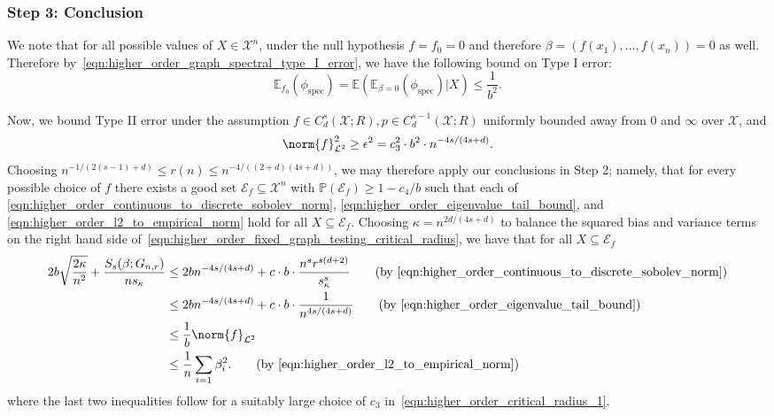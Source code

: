 \documentclass{article}
\newcommand{\1}{\mathbf{1}}
\newcommand{\Xset}{\mathcal{X}}
\newcommand{\Leb}{\mathcal{L}}
\newcommand{\Pbb}{\mathbb{P}}
\newcommand{\Ebb}{\mathbb{E}}
\newcommand{\spec}{\mathrm{spec}}
\theoremstyle{alden}
\theoremstyle{aldenthm}
\theoremstyle{definition}
\theoremstyle{remark}
\begin{document}
\subsubsection{Step 3: Conclusion}

We note that for all possible values of $X \in \Xset^n$, under the null hypothesis $f = f_0 = 0$ and therefore $\beta = (f(x_1),\ldots,f(x_n)) = 0$ as well. Therefore by~\eqref{eqn:higher_order_graph_spectral_type_I_error}, we have the following bound on Type I error:
\begin{equation}
\Ebb_{f_0}(\phi_{\mathrm{spec}}) = \mathbb{E}(\mathbb{E}_{\beta = 0}(\phi_{\spec}) | X) \leq \frac{1}{b^2}.
\end{equation}

Now, we bound Type II error under the assumption $f \in C_d^s(\mathcal{X};R), p \in C_d^{s - 1}(\Xset;R)$ uniformly bounded away from $0$ and $\infty$ over $\Xset$, and 
\begin{equation}
\label{eqn:higher_order_critical_radius_1}
\norm{f}_{\Leb^2}^2 \geq \epsilon^2 = c_3^2 \cdot b^2 \cdot n^{-4s/(4s + d)}.
\end{equation}
Choosing $n^{-1/(2(s - 1) + d)}\leq r(n) \leq n^{-4/((2+d)(4s + d))}$, we may therefore apply our conclusions in Step 2; namely, that for every possible choice of $f$ there exists a good set $\mathcal{E}_f \subseteq \Xset^n$ with $\Pbb(\mathcal{E}_f) \geq 1 - c_4/b$ such that each of \eqref{eqn:higher_order_continuous_to_discrete_sobolev_norm}, \eqref{eqn:higher_order_eigenvalue_tail_bound}, and \eqref{eqn:higher_order_l2_to_empirical_norm} hold for all $X \subseteq \mathcal{E}_f$. Choosing $\kappa = n^{2d/(4s + d)}$ to balance the squared bias and variance terms on the right hand side of~\eqref{eqn:higher_order_fixed_graph_testing_critical_radius}, we have that for all $X \subseteq \mathcal{E}_f$
\begin{align*}
2b\sqrt{\frac{2\kappa}{n^2}} + \frac{S_s(\beta;G_{n,r})}{ns_{\kappa}} & \leq 2bn^{-4s/(4s+d)} + c\cdot b \cdot \frac{n^{s} r^{s(d + 2)}}{s_{\kappa}^s} \tag{by \eqref{eqn:higher_order_continuous_to_discrete_sobolev_norm}} \\
& \leq 2bn^{-4s/(4s+d)} + c\cdot b \cdot\frac{1}{n^{4s/(4s+d)}} \tag{by \eqref{eqn:higher_order_eigenvalue_tail_bound}} \\
& \leq \frac{1}{b}\norm{f}_{\Leb^2} \\
& \leq \frac{1}{n}\sum_{i = 1} \beta_i^2. \tag{by \eqref{eqn:higher_order_l2_to_empirical_norm}}
\end{align*}
where the last two inequalities follow for a suitably large choice of $c_3$ in~\eqref{eqn:higher_order_critical_radius_1}.
\end{document}
